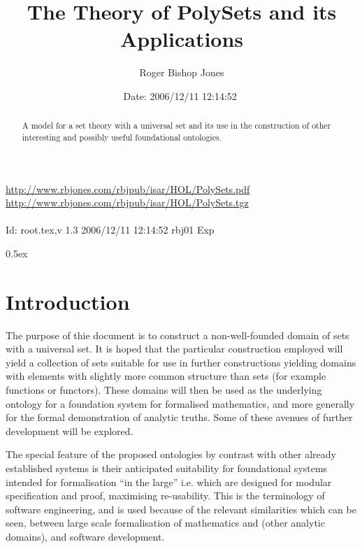 \documentclass[11pt,a4paper]{article}
\begin{document}
\title{The Theory of PolySets and its Applications}

\author{Roger Bishop Jones}
\date{$ $Date: 2006/12/11 12:14:52 $ $}
\maketitle

\begin{abstract}
A model for a set theory with a universal set and its use in the construction of other interesting and possibly useful foundational ontologies.
\end{abstract}

\vfill
\begin{centering}
{\footnotesize
\href{http://www.rbjones.com/rbjpub/isar/HOL/PolySets.pdf}{http://www.rbjones.com/rbjpub/isar/HOL/PolySets.pdf}\\
\href{http://www.rbjones.com/rbjpub/isar/HOL/PolySets.tgz}{http://www.rbjones.com/rbjpub/isar/HOL/PolySets.tgz}\\
\ \\
$ $Id: root.tex,v 1.3 2006/12/11 12:14:52 rbj01 Exp $ $\\
}%
\end{centering}

\newpage

\tableofcontents

\parindent 0pt\parskip 0.5ex
\newpage
\section{Introduction}

The purpose of thie document is to construct a non-well-founded domain of sets with a universal set.
It is hoped that the particular construction employed will yield a collection of sets suitable for use in further constructions yielding domains with elements with slightly more common structure than sets (for example functions or functors).
These domains will then be used as the underlying ontology for a foundation system for formalised mathematics, and more generally for the formal demonstration of analytic truths.
Some of these avenues of further development will be explored.

The special feature of the proposed ontologies by contrast with other already established systems is their anticipated suitability for foundational systems intended for formalisation ``in the large'' i.e. which are designed for modular specification and proof, maximising re-usability.
This is the terminology of software engineering, and is used because of the relevant similarities which can be seen, between large scale formalisation of mathematics and (other analytic domains), and software development.
\end{document}
